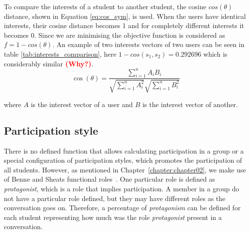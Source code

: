 \begin{table}[]

\caption{Comparison of interests between $s_1$ and $s_2$.}
\label{tab:interests_comparison}

\centering
{}
\end{table}

To compare the interests of a student to another student, the cosine $cos(\theta)$ distance, shown in Equation \ref{eq:cos_sym}, is used. When the users have identical interests, their cosine distance becomes 1 and for completely different interests it becomes 0. Since we are minimising the objective function is considered as $f = 1 - cos(\theta)$. An example of two interests vectors of two users can be seen in table \ref{tab:interests_comparison}, here $1 - cos(s_1,s_2) = 0.292696$ which is considerably similar \textcolor{red}{\bf (Why?)}.\\

\begin{equation} \label{eq:cos_sym}
    \cos(\theta) = \frac{ \sum\limits_{i=1}^{n}{A_i  B_i} }{ \sqrt{\sum\limits_{i=1}^{n}{A_i^2}}  \sqrt{\sum\limits_{i=1}^{n}{B_i^2}} }   
\end{equation}

\noindent where $A$ is the interest vector of a user and $B$ is the interest vector of another.

\subsection{Participation style}


There is no defined function that allows calculating participation in a group or a special configuration of participation styles, which promotes the participation of all students. 
However, as mentioned in Chapter~\ref{chapter:chapter02}, we make use of Benne and Sheats functional roles~\cite{FunctionalRoles}. One particular role is defined as \textit{protagonist}, which is a role that implies participation. A member in a group do not have a particular role defined, but they may have different roles as the conversation goes on. Therefore, a percentage of \textit{protagonism} can be defined for each student representing how much was the role \textit{protagonist} present in a conversation.\\

